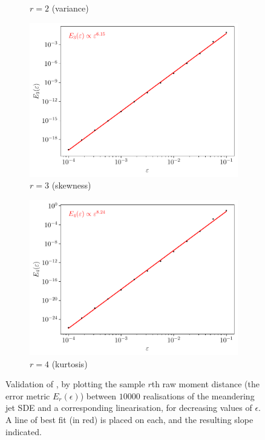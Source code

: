 \begin{figure}
\begin{center}
\begin{subfigure}{0.49\textwidth}
			\caption{\(r = 2\) (variance)}
			\label{fig:gamma_z_valid_2}
		\end{subfigure}
		\begin{subfigure}{0.49\textwidth}
			\includegraphics[width=\textwidth]{chp04_paper_numerics/figures/rossby/str_err_r_3.0.pdf}
			\caption{\(r = 3\) (skewness)}
			\label{fig:gamma_z_valid_3}
		\end{subfigure}
		\begin{subfigure}{0.49\textwidth}
			\includegraphics[width=\textwidth]{chp04_paper_numerics/figures/rossby/str_err_r_4.0.pdf}
			\caption{\(r = 4\) (kurtosis)}
			\label{fig:gamma_z_valid_4}
		\end{subfigure}

		\caption{Validation of , by plotting the sample \(r\)th raw moment distance (the error metric \(E_r(\epsilon)\)) between \(10000\) realisations of the meandering jet SDE and a corresponding linearisation, for decreasing values of \(\epsilon\).
			A line of best fit (in red) is placed on each, and the resulting slope indicated.}
		\label{fig:gamma_z_valid}
	\end{center}
\end{figure}


